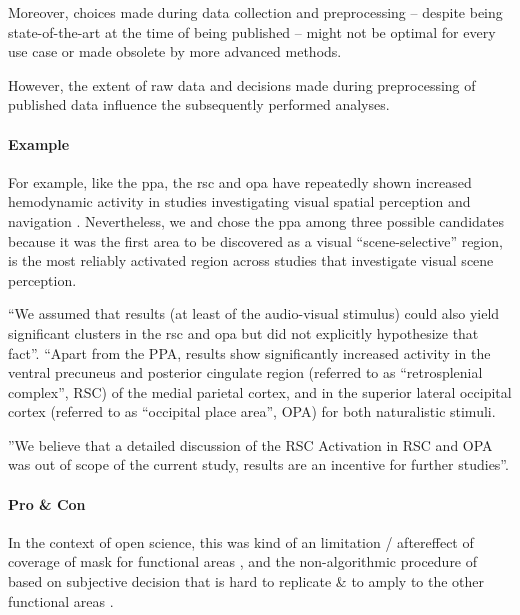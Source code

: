 Moreover, choices made during data collection and preprocessing -- despite being
state-of-the-art at the time of being published -- might not be optimal for
every use case or made obsolete by more advanced methods.

%
However, the extent of raw data and decisions made during preprocessing of
published data influence the subsequently performed analyses.

\paragraph{Example}
%
For example, like the \ac{ppa}, the \ac{rsc} and \ac{opa} have repeatedly shown
increased hemodynamic activity in studies investigating visual spatial
perception and navigation \citep{chrastil2018heterogeneity, bettencourt2013role,
dilks2013occipital, epstein2019scene}.
%
Nevertheless, we and \citet{sengupta2016extension} chose the \ac{ppa} among
three possible candidates because it was the first area to be discovered as a
visual ``scene-selective'' region, is the most reliably activated region across
studies that investigate visual scene perception.

%
``We assumed that results (at least of the audio-visual stimulus) could also
yield significant clusters in the \ac{rsc} and \ac{opa} but did not explicitly
hypothesize that fact''.
%
``Apart from the PPA, results show significantly increased activity in the
ventral precuneus and posterior cingulate region (referred to as ``retrosplenial
complex'', RSC) of the medial parietal cortex, and in the superior lateral
occipital cortex (referred to as ``occipital place area'', OPA) for both
naturalistic stimuli.

%
''We believe that a detailed discussion of the RSC Activation in RSC and OPA was
out of scope of the current study, results are an incentive for further
studies''.


\paragraph{Pro \& Con}


%
In the context of open science, this was kind of an limitation / aftereffect of
coverage of mask for functional areas \citet{sengupta2016extension}, and the
non-algorithmic procedure of \citet{sengupta2016extension} based on subjective
decision that is hard to replicate \& to amply to the other functional areas
\citep[cf. algorithmic procedure in, e.g.,][]{julian2012algorithmic}.

